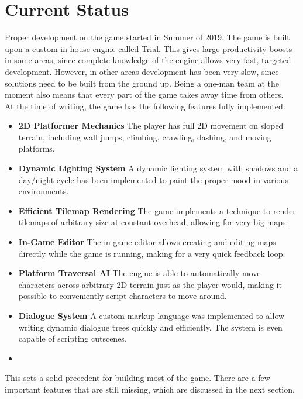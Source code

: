 \section{Current Status}
Proper development on the game started in Summer of 2019. The game is built upon a custom in-house engine called \href{https://shirakumo.org/trial}{Trial}. This gives large productivity boosts in some areas, since complete knowledge of the engine allows very fast, targeted development. However, in other areas development has been very slow, since solutions need to be built from the ground up. Being a one-man team at the moment also means that every part of the game takes away time from others.\\

At the time of writing, the game has the following features fully implemented:

\begin{itemize}
\item \textbf{2D Platformer Mechanics}\quad
  The player has full 2D movement on sloped terrain, including wall jumps, climbing, crawling, dashing, and moving platforms.
\item \textbf{Dynamic Lighting System}\quad
  A dynamic lighting system with shadows and a day/night cycle has been implemented to paint the proper mood in various environments.
\item \textbf{Efficient Tilemap Rendering}\quad
  The game implements a technique to render tilemaps of arbitrary size at constant overhead, allowing for very big maps.
\item \textbf{In-Game Editor}\quad
  The in-game editor allows creating and editing maps directly while the game is running, making for a very quick feedback loop.
\item \textbf{Platform Traversal AI}\quad
  The engine is able to automatically move characters across arbitrary 2D terrain just as the player would, making it possible to conveniently script characters to move around.
\item \textbf{Dialogue System}\quad
  A custom markup language was implemented to allow writing dynamic dialogue trees quickly and efficiently. The system is even capable of scripting cutscenes.
\item \textbf{}\quad
\end{itemize}

This sets a solid precedent for building most of the game. There are a few important features that are still missing, which are discussed in the next section.


